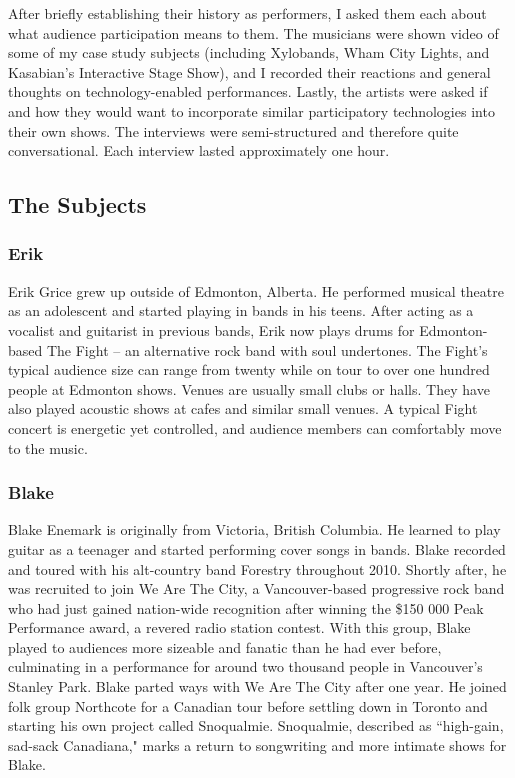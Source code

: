 After briefly establishing their history as performers, I asked them each about what audience participation means to them. The musicians were shown video of some of my case study subjects (including Xylobands, Wham City Lights, and Kasabian's Interactive Stage Show), and I recorded their reactions and general thoughts on technology-enabled performances. Lastly, the artists were asked if and how they would want to incorporate similar participatory technologies into their own shows. The interviews were semi-structured and therefore quite conversational. Each interview lasted approximately one hour.

\subsection{The Subjects}

\subsubsection{Erik}
Erik Grice grew up outside of Edmonton, Alberta. He performed musical theatre as an adolescent and started playing in bands in his teens. After acting as a vocalist and guitarist in previous bands, Erik now plays drums for Edmonton-based The Fight -- an alternative rock band with soul undertones. The Fight's typical audience size can range from twenty while on tour to over one hundred people at Edmonton shows. Venues are usually small clubs or halls. They have also played acoustic shows at cafes and similar small venues. A typical Fight concert is energetic yet controlled, and audience members can comfortably move to the music.

\subsubsection{Blake}
Blake Enemark is originally from Victoria, British Columbia. He learned to play guitar as a teenager and started performing cover songs in bands. Blake recorded and toured with his alt-country band Forestry throughout 2010. Shortly after, he was recruited to join We Are The City, a Vancouver-based progressive rock band who had just gained nation-wide recognition after winning the \$150 000 Peak Performance award, a revered radio station contest. With this group, Blake played to audiences more sizeable and fanatic than he had ever before, culminating in a performance for around two thousand people in Vancouver's Stanley Park. Blake parted ways with We Are The City after one year. He joined folk group Northcote for a Canadian tour before settling down in Toronto and starting his own project called Snoqualmie. Snoqualmie, described as ``high-gain, sad-sack Canadiana," marks a return to songwriting and more intimate shows for Blake.

